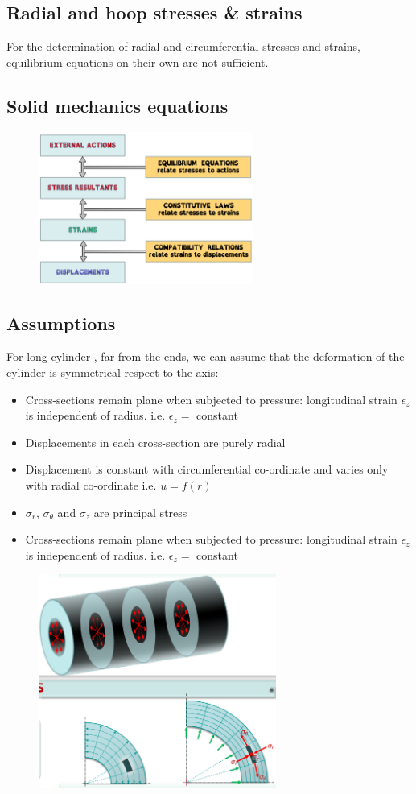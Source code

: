 \documentclass[class=report, crop=false, 12pt,a4paper]{standalone}
\begin{document}
\subsection{Radial and hoop stresses \& strains}
For the determination of radial and circumferential stresses and strains, equilibrium equations on their own are not sufficient.
\subsection{Solid mechanics equations}
\begin{figure}[H]
    \centering
    \includegraphics[height = 5cm]{../img/diagram107.png}
    \caption{}
\end{figure}
\subsection{Assumptions}
For long cylinder , far from the ends, we can assume that the deformation of the cylinder is symmetrical respect to the axis:
\begin{itemize}
    \item Cross-sections remain plane when subjected to pressure: longitudinal strain $\epsilon_z$ is independent of radius. i.e. $\epsilon_z =$ constant
    \item Displacements in each cross-section are purely radial
    \item Displacement is constant with circumferential co-ordinate and varies only with radial co-ordinate i.e. $u=f(r)$
    \item $\sigma_r$, $\sigma_{\theta}$ and $\sigma_z$ are principal stress
    \item Cross-sections remain plane when subjected to pressure: longitudinal strain $\epsilon_z$ is independent of radius. i.e. $\epsilon_z =$ constant
\end{itemize}
\begin{figure}[H]
    \centering
    \includegraphics[height = 7cm]{../img/diagram108.png}
    \caption{}
\end{figure}
\end{document}
